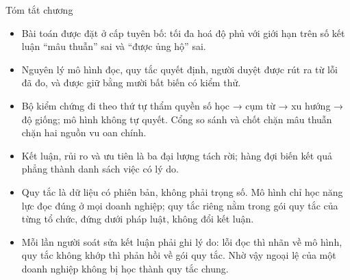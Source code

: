 \FloatBarrier
\begin{hopy}{Tóm tắt chương}
\begin{itemize}
\item Bài toán được đặt ở cấp tuyên bố: tối đa hoá độ phủ với giới hạn trên số kết luận “mâu thuẫn” sai và “được ủng hộ” sai.
\item Nguyên lý mô hình đọc, quy tắc quyết định, người duyệt được rút ra từ lỗi đã đo, và được giữ bằng mười bất biến có kiểm thử.
\item Bộ kiểm chứng đi theo thứ tự thẩm quyền số học → cụm từ → xu hướng → độ giống; mô hình không tự quyết. Cổng so sánh và chốt chặn mâu thuẫn chặn hai nguồn vu oan chính.
\item Kết luận, rủi ro và ưu tiên là ba đại lượng tách rời; hàng đợi biến kết quả phẳng thành danh sách việc có lý do.
\item Quy tắc là dữ liệu có phiên bản, không phải trọng số. Mô hình chỉ học năng lực đọc đúng ở mọi doanh nghiệp; quy tắc riêng nằm trong gói quy tắc của từng tổ chức, đứng dưới pháp luật, không đổi kết luận.
\item Mỗi lần người soát sửa kết luận phải ghi lý do: lỗi đọc thì nhãn về mô hình, quy tắc không khớp thì phản hồi về gói quy tắc. Nhờ vậy ngoại lệ của một doanh nghiệp không bị học thành quy tắc chung.
\end{itemize}
\end{hopy}
